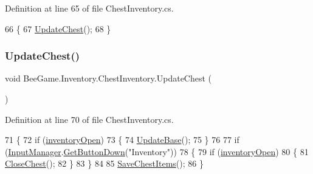 Definition at line 65 of file Chest\+Inventory.\+cs.


\begin{DoxyCode}
66         \{
67             \hyperlink{class_bee_game_1_1_inventory_1_1_chest_inventory_aecb5561a169d112e46b2270d8b8548e5}{UpdateChest}();
68         \}
\end{DoxyCode}
\mbox{\label{class_bee_game_1_1_inventory_1_1_chest_inventory_aecb5561a169d112e46b2270d8b8548e5}} 
\subsubsection{\texorpdfstring{Update\+Chest()}{UpdateChest()}}
{\footnotesize\ttfamily void Bee\+Game.\+Inventory.\+Chest\+Inventory.\+Update\+Chest (\begin{DoxyParamCaption}{ }\end{DoxyParamCaption})}



Definition at line 70 of file Chest\+Inventory.\+cs.


\begin{DoxyCode}
71         \{
72             \textcolor{keywordflow}{if} (\hyperlink{class_bee_game_1_1_inventory_1_1_chest_inventory_a3e3529178934f2a4a8e91529c148457c}{inventoryOpen})
73             \{
74                 \hyperlink{class_bee_game_1_1_inventory_1_1_inventory_base_aa1a965cf7ba9e04b22a4ef85ad133854}{UpdateBase}();
75             \}
76 
77             \textcolor{keywordflow}{if} (\hyperlink{class_bee_game_1_1_core_1_1_input_manager}{InputManager}.\hyperlink{class_bee_game_1_1_core_1_1_input_manager_ac90aab89652007118b67f60e962103c5}{GetButtonDown}(\textcolor{stringliteral}{"Inventory"}))
78             \{
79                 \textcolor{keywordflow}{if} (\hyperlink{class_bee_game_1_1_inventory_1_1_chest_inventory_a3e3529178934f2a4a8e91529c148457c}{inventoryOpen})
80                 \{
81                     \hyperlink{class_bee_game_1_1_inventory_1_1_chest_inventory_a0a42c60f89a1c79ce2be4f23da86e7b6}{CloseChest}();
82                 \}
83             \}
84 
85             \hyperlink{class_bee_game_1_1_inventory_1_1_chest_inventory_a3e9326154a7f2602ba03bd6b21aba93f}{SaveChestItems}();
86         \}
\end{DoxyCode}
\mbox{\label{class_bee_game_1_1_inventory_1_1_chest_inventory_a426c17adf8e95a36e24f9793f6c90b48}} 
